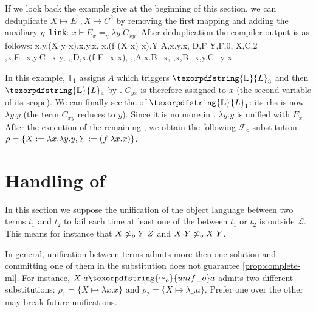 \documentclass[sigconf,natbib=false,review]{acmart}
\newcommand{\appsep}{\ensuremath{\textcolor{lightgray}{\cdot}}}
\newcommand{\UnifRel}{\ensuremath{\simeq}}
\newcommand{\nUnifRel}{\ensuremath{\not\simeq}}
\newcommand{\Uo}{\texorpdfstring{\ensuremath{\UnifRel_o}\xspace}{unif\_o}}
\newcommand{\nUo}{\ensuremath{\nUnifRel_o}\xspace}
\newcommand{\llambda}{\ensuremath{\mathcal{L}}\xspace}
\newcommand{\linkMacro}[1]{\ensuremath{#1}\texttt{-link}\xspace}
\newcommand{\linketa} {\linkMacro{\eta}}
\newcommand{\Fo}{\texorpdfstring{\ensuremath{\mathcal{F}_{\!o}\xspace}}{Fo}} %
\newcommand{\linketaM}[3]{\ensuremath{#1 \vdash #2 =_\eta #3}}
\newcommand{\mapping}[3]{\ensuremath{#1 \mapsto #2^#3}}
\newcommand{\rhs}{rhs\xspace}
\newcommand{\linkStore}{\texorpdfstring{\ensuremath{\mathbb{L}}\xspace}{L}}
\newcommand{\hoUnifPb}{\ensuremath{\mathbb{T}}\xspace}
\begin{document}
If we look back the example give at the beginning of this section, we can
deduplicate $\mapping{X}{E}{1}, \mapping{X}{C}{2}$ by removing the first mapping
and adding the auxiliary \linketa: \linketaM{x}{E_{x}}{\lambda y.C_{x y}}.
After deduplication the compiler output is as follows:
\printAlll
  {{{\lambda x.\lambda y.(X\appsep y\appsep x),\lambda x.\lambda y.x},
    {\lambda x.(f\appsep (X\appsep x)\appsep x),Y}}}
  {{{A,\lambda x.\lambda y.x},
    {D,F}}}
  {{{Y,F,0},
    {X,C,2}}}
  {{{\eta,x,E_{x},\lambda y.C_{x y}},
    {\eta,,D,\lambda x.(f\appsep E_{x}\appsep x)},
    {\eta,,A,\lambda x.B_{x}},
    {\eta,x,B_{x},\lambda y.C_{y x}}}}

In this example, $\hoUnifPb_1$ assigns $A$ which triggers $\linkStore_3$ and
then $\linkStore_4$ by \progressetaleft. $C_{yx}$ is therefore
assigned to $x$ (the second variable of its scope). We can finally see the
\progressetaright of $\linkStore_1$: its \rhs is now $\lambda y.y$ (the term $C_{xy}$
reduces to $y$). Since it is no more in \maybeeta, $\lambda y.y$ is unified with
$E_x$. After the execution of the remaining \hstep, we obtain the 
following \Fo{} substitution $\rho = \{X := \lambda x.\lambda y.y, Y := (f\appsep \lambda x.x)\}$.

\section{Handling of \notllambda}\label{sec:beta}

In this section we suppose the unification of the object language between two
terms $t_1$ and $t_2$ to fail each time at least one of the between $t_1$ or
$t_2$ is outside $\llambda$. This means for instance that $X \nUo Y \appsep Z$ and 
$X\appsep Y \nUo X\appsep Y$.


In general, unification between \notllambda terms admits more then one
solution and committing one of them in the substitution does not guarantee
\cref{prop:complete-ml}. For instance, $X \appsep a \Uo a$ 
admits two different substitutions: $\rho_1 = \{X \mapsto \lambda x.x\}$
and $\rho_2 = \{X \mapsto \lambda \_.a\}$. Prefer one over the other may break
future unifications.
\end{document}
